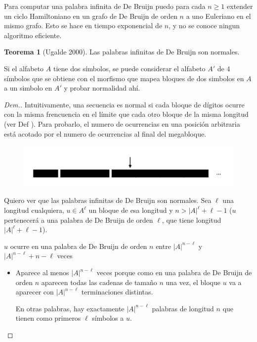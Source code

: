 \documentclass{report}
\theoremstyle{definition} %
\newtheorem{theorem}{Teorema}
\begin{document}
Para computar una palabra infinita de De Bruijn puedo para cada $n \geq 1$
extender un ciclo Hamiltoniano en un grafo de De Bruijn de orden $n$ a uno
Euleriano en el mismo grafo. Esto se hace en tiempo exponencial de $n$, y no se
conoce ningun algoritmo eficiente.

\begin{theorem}[Ugalde 2000]
    Las palabras infinitas de De Bruijn son normales.

    Si el alfabeto $A$ tiene dos símbolos, se puede considerar el alfabeto $A'$
    de 4 símbolos que se obtiene con el morfismo que mapea bloques de dos
    simbolos en $A$ a un simbolo en $A'$ y probar normalidad ahí.
\end{theorem}
\begin{proof}[Dem.]
    Intuitivamente, una secuencia es normal si cada bloque de dígitos ocurre con
    la misma frencuencia en el límite que cada otro bloque de la misma longitud
    (ver Def ). Para probarlo, el numero de ocurrencias en
    una posición arbitraria está acotado por el numero de ocurrencias al final
    del megabloque.
    
    \begin{figure}[H]
        \centering
        \includegraphics[scale=0.3]{img/2_de_brujin_inf_normal_block.png}
    \end{figure}

    Quiero ver que las palabras infinitas de De Bruijn son normales. Sea $\ell$ una longitud cualquiera, $u \in A^\ell$ un bloque de esa longitud y $n > |A|^\ell + \ell - 1$ ($u$ pertenecerá a una palabra de De Bruijn de orden $\ell$, que tiene longitud $|A|^\ell + \ell - 1$).

    $u$ ocurre en una palabra de De Bruijn de orden $n$ entre $|A|^{n - \ell}$
    y $|A|^{n - \ell} + n - \ell$ veces
    \begin{itemize}
        \item Aparece al menos $|A|^{n - \ell}$ veces porque como en una palabra de De Bruijn de orden $n$ aparecen todas las cadenas de tamaño $n$ una vez, el bloque $u$ va a aparecer con $|A|^{n - \ell}$ terminaciones distintas.
        
        En otras palabras, hay exactamente $|A|^{n - \ell}$ palabras de longitud $n$ que tienen como primeros $\ell$ símbolos a $u$.


\end{itemize}
\end{proof}
\end{document}
